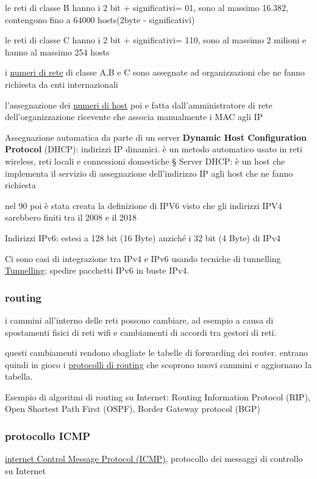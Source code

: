 \documentclass[12pt]{article}
\begin{document}
le reti di classe B hanno i 2 bit + significativi= 01, sono al massimo 16.382, contengono fino a 64000 hosts(2byte - significativi)

le reti di classe C hanno i 2 bit + significativi= 110, sono al massimo 2 milioni e hanno al massimo 254 hosts

i \underline{numeri di rete} di classe A,B e C sono assegnate ad organizzazioni che ne fanno richiesta da enti internazionali

l'assegnazione dei \underline{numeri di host} poi e fatta dall'amministratore di rete dell'organizzazione ricevente che associa manualmente i MAC agli IP

Assegnazione automatica da parte di un server \textbf{Dynamic Host Configuration Protocol}
(DHCP): indirizzi IP dinamici.
è un metodo automatico usato in reti wireless, reti locali e connessioni domestiche
§ Server DHCP: è un host che implementa il servizio di assegnazione dell’indirizzo
IP agli host che ne fanno richiesta


nel 90 poi è stata creata la definizione di IPV6 visto che gli indirizzi IPV4 sarebbero finiti tra il 2008 e il 2018

Indirizzi IPv6: estesi a 128 bit (16 Byte) anziché i 32 bit (4 Byte) di IPv4

Ci sono casi di integrazione tra IPv4 e IPv6 usando tecniche di tunnelling
\underline{Tunnelling}: spedire pacchetti IPv6 in buste IPv4.

\subsubsection{routing}

i cammini all'interno delle reti possono cambiare, ad esempio a causa di spostamenti fisici di reti wifi e cambiamenti di accordi tra gestori di reti.

questi cambiamenti rendono sbagliate le tabelle di forwarding dei router.
entrano quindi in gioco i \underline{protocolli di routing} che scoprono nuovi cammini e aggiornano la tabella.

Esempio di algoritmi di routing su Internet: Routing Information Protocol (RIP), Open
Shortest Path First (OSPF), Border Gateway protocol (BGP)

\subsubsection{protocollo ICMP}

\underline{internet Control Message Protocol (ICMP)}, protocollo dei messaggi di controllo su Internet
\end{document}
